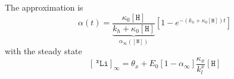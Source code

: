 \documentclass[aps,onecolumn,11pt]{revtex4}
\newcommand{\mychem}[1]{\mathtt{#1}}
\newcommand{\myconc}[1]{\left\lbrack{#1}\right\rbrack}
\newcommand{\spLi}[1]{{~^{\mychem{#1}}\mychem{Li}}}
\newcommand{\Li}[1]{\myconc{\spLi{#1}}}
\newcommand{\spproton}{\mychem{H}}
\newcommand{\proton}{\myconc{\spproton}}
\begin{document}
The approximation is
\begin{equation}
	\alpha(t) = \underbrace{\dfrac{\kappa_0 \proton}{k_h + \kappa_0 \proton}}_{\alpha_\infty\left(\proton\right)}\left[1-e^{\displaystyle-\left(k_h+\kappa_0\proton\right)t}  \right]
\end{equation}
with the steady state
\begin{equation}
	\Li{x}_\infty = \theta_x + E_0 \left[1-\alpha_\infty\right] \dfrac{\kappa_x}{k_l^x} \proton
\end{equation}
\end{document}
